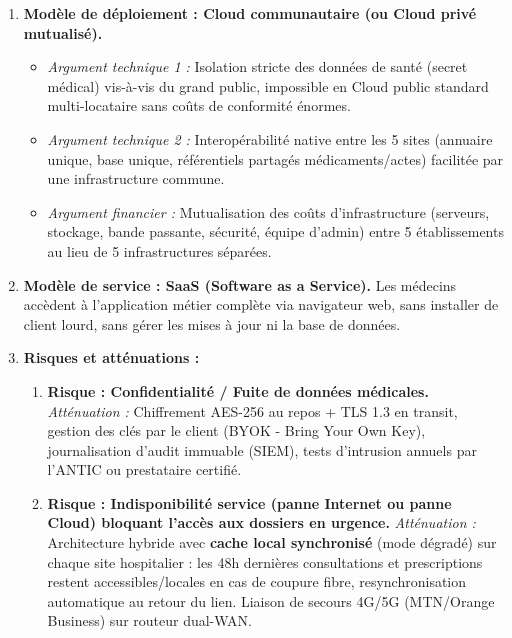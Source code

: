 \documentclass[11pt]{article}
\begin{document}
\begin{corrige}
\begin{enumerate}
\item \textbf{Modèle de déploiement : Cloud communautaire (ou Cloud privé mutualisé).}
    \begin{itemize}
    \item \emph{Argument technique 1 :} Isolation stricte des données de santé (secret médical) vis-à-vis du grand public, impossible en Cloud public standard multi-locataire sans coûts de conformité énormes.
    \item \emph{Argument technique 2 :} Interopérabilité native entre les 5 sites (annuaire unique, base unique, référentiels partagés médicaments/actes) facilitée par une infrastructure commune.
    \item \emph{Argument financier :} Mutualisation des coûts d'infrastructure (serveurs, stockage, bande passante, sécurité, équipe d'admin) entre 5 établissements au lieu de 5 infrastructures séparées.
    \end{itemize}
\item \textbf{Modèle de service : SaaS (Software as a Service).} Les médecins accèdent à l'application métier complète via navigateur web, sans installer de client lourd, sans gérer les mises à jour ni la base de données.
\item \textbf{Risques et atténuations :}
    \begin{enumerate}
    \item \textbf{Risque : Confidentialité / Fuite de données médicales.} \emph{Atténuation :} Chiffrement AES-256 au repos + TLS 1.3 en transit, gestion des clés par le client (BYOK - Bring Your Own Key), journalisation d'audit immuable (SIEM), tests d'intrusion annuels par l'ANTIC ou prestataire certifié.
    \item \textbf{Risque : Indisponibilité service (panne Internet ou panne Cloud) bloquant l'accès aux dossiers en urgence.} \emph{Atténuation :} Architecture hybride avec \textbf{cache local synchronisé} (mode dégradé) sur chaque site hospitalier : les 48h dernières consultations et prescriptions restent accessibles/locales en cas de coupure fibre, resynchronisation automatique au retour du lien. Liaison de secours 4G/5G (MTN/Orange Business) sur routeur dual-WAN.
    \end{enumerate}
\end{enumerate}
\end{corrige}

\newpage
\end{document}
